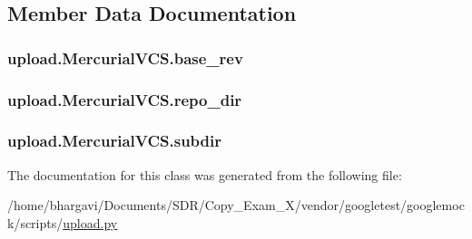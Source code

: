 \subsection{Member Data Documentation}
\subsubsection[{\texorpdfstring{base\+\_\+rev}{base_rev}}]{\setlength{\rightskip}{0pt plus 5cm}upload.\+Mercurial\+V\+C\+S.\+base\+\_\+rev}\hypertarget{classupload_1_1_mercurial_v_c_s_a41faae7820d5a015f4a42476e5e4ab8c}{}\label{classupload_1_1_mercurial_v_c_s_a41faae7820d5a015f4a42476e5e4ab8c}
\subsubsection[{\texorpdfstring{repo\+\_\+dir}{repo_dir}}]{\setlength{\rightskip}{0pt plus 5cm}upload.\+Mercurial\+V\+C\+S.\+repo\+\_\+dir}\hypertarget{classupload_1_1_mercurial_v_c_s_a219c1e0ab9ce864e3231913762ea489b}{}\label{classupload_1_1_mercurial_v_c_s_a219c1e0ab9ce864e3231913762ea489b}
\subsubsection[{\texorpdfstring{subdir}{subdir}}]{\setlength{\rightskip}{0pt plus 5cm}upload.\+Mercurial\+V\+C\+S.\+subdir}\hypertarget{classupload_1_1_mercurial_v_c_s_a0dad32e621f5523e3430d867184f0b42}{}\label{classupload_1_1_mercurial_v_c_s_a0dad32e621f5523e3430d867184f0b42}


The documentation for this class was generated from the following file\+:\begin{DoxyCompactItemize}
\item 
/home/bhargavi/\+Documents/\+S\+D\+R/\+Copy\+\_\+\+Exam\+\_\+X/vendor/googletest/googlemock/scripts/\hyperlink{googlemock_2scripts_2upload_8py}{upload.\+py}\end{DoxyCompactItemize}
